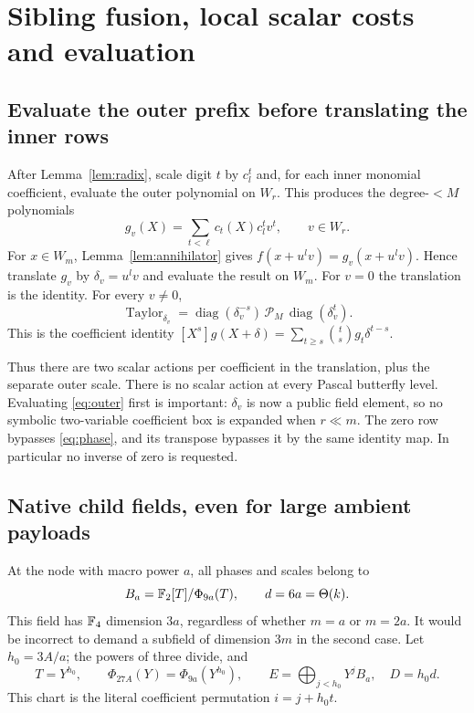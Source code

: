 \section{Sibling fusion, local scalar costs and evaluation}\label{sec:evaluation}

\subsection{Evaluate the outer prefix before translating the inner rows}
After Lemma~\ref{lem:radix}, scale digit $t$ by $c_l^t$ and, for
each inner monomial coefficient, evaluate the outer polynomial on
$W_r$. This produces the degree-$<M$ polynomials
\begin{equation}\label{eq:outer}
 g_v(X)=\sum_{t<\ell}c_t(X)c_l^tv^t,\qquad v\in W_r.
\end{equation}
For $x\in W_m$, Lemma~\ref{lem:annihilator} gives
$f(x+u^lv)=g_v(x+u^lv)$. Hence translate $g_v$ by
$\delta_v=u^lv$ and evaluate the result on $W_m$.
For $v=0$ the translation is the identity. For every $v\ne0$,
\begin{equation}\label{eq:phase}
 \operatorname{Taylor}_{\delta_v}
 =\operatorname{diag}(\delta_v^{-s})\,
   \mathcal P_M\,
   \operatorname{diag}(\delta_v^t).
\end{equation}
This is the coefficient identity
$[X^s]g(X+\delta)=\sum_{t\geq s}\binom ts g_t\delta^{t-s}$.

Thus there are two scalar actions per coefficient in the translation,
plus the separate outer scale. There is no scalar action at every
Pascal butterfly level. Evaluating \eqref{eq:outer} first is important:
$\delta_v$ is now a public field element, so no symbolic two-variable
coefficient box is expanded when $r\ll m$. The zero row bypasses
\eqref{eq:phase}, and its transpose bypasses it by the same identity
map. In particular no inverse of zero is requested.

\subsection{Native child fields, even for large ambient payloads}
At the node with macro power $a$, all phases and scales belong to
\[
 B_a=\mathbb F_2[T]/\Phi_{9a}(T),\qquad d=6a=\Theta(k).
\]
This field has $\mathbb F_4$ dimension $3a$, regardless of whether $m=a$ or
$m=2a$. It would be incorrect to demand a subfield of dimension $3m$
in the second case. Let $h_0=3A/a$; the powers of three divide, and
\begin{equation}\label{eq:module}
 T=Y^{h_0},\qquad
 \Phi_{27A}(Y)=\Phi_{9a}(Y^{h_0}),\qquad
 E=\bigoplus_{j<h_0}Y^j B_a,\quad D=h_0d.
\end{equation}
This chart is the literal coefficient permutation $i=j+h_0t$.

